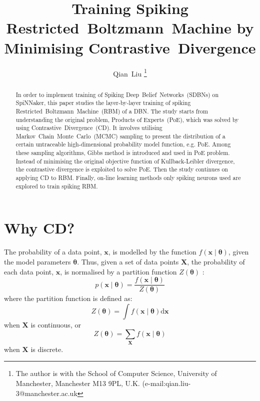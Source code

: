 \documentclass[11pt,twoside,a4paper]{article}
\def\D{\mathrm{d}}
\begin{document}
\title{Training Spiking Restricted~Boltzmann~Machine by Minimising Contrastive~Divergence}
\author{
Qian~Liu
\thanks{
The author is with the School of Computer Science, University of Manchester, Manchester M13 9PL, U.K. 
(e-mail:qian.liu-3@manchester.ac.uk}
}
\maketitle
\thispagestyle{empty}

\begin{abstract}
In order to implement training of Spiking Deep~Belief~Networks~(SDBNs) on SpiNNaker, this paper studies the layer-by-layer training of spiking Restricted~Boltzmann~Machine~(RBM) of a DBN.
The study starts from understanding the original problem, Products of Experts~(PoE), which was solved by using Contrastive~Divergence~(CD).
It involves utilising Markov~Chain~Monte~Carlo~(MCMC) sampling to present the distribution of a certain untraceable high-dimensional probability model function, e.g. PoE.
Among these sampling algorithms, Gibbs method is introduced and used in PoE problem.
Instead of minimising the original objective function of Kullback-Leibler divergence, the contrastive divergence is exploited to solve PoE.
Then the study continues on applying CD to RBM.
Finally, on-line learning methods only spiking neurons used are explored to train spiking RBM.

\end{abstract}
\section{Why CD?\cite{hinton2002training,woodfordnotes}}
The probability of a data point, $ \mathbf{x} $,  is modelled by the function $f(\mathbf{x} \mid \mathbf{\theta} )$, given the model parameters $ \mathbf{\theta} $. 
Thus, given a set of data points $ \mathbf{X} $, the probability of each data point,  $ \mathbf{x} $, is normalised by a partition function $Z( \mathbf{\theta})$ :
\begin{equation}
p(\mathbf{x} \mid \mathbf{\theta} ) = \dfrac{f(\mathbf{x} \mid \mathbf{\theta} )}{Z( \mathbf{\theta})}
\end{equation}
where the partition function is defined as:
\begin{equation}
Z( \mathbf{\theta}) = \int f(\mathbf{x} \mid \mathbf{\theta} )\D\mathbf{x}
\end{equation}
when  $ \mathbf{X} $ is continuous, or
\begin{equation}
Z( \mathbf{\theta}) = \sum_\mathbf{X} f(\mathbf{x} \mid \mathbf{\theta} )
\end{equation}
when  $ \mathbf{X} $ is discrete.
\end{document}

